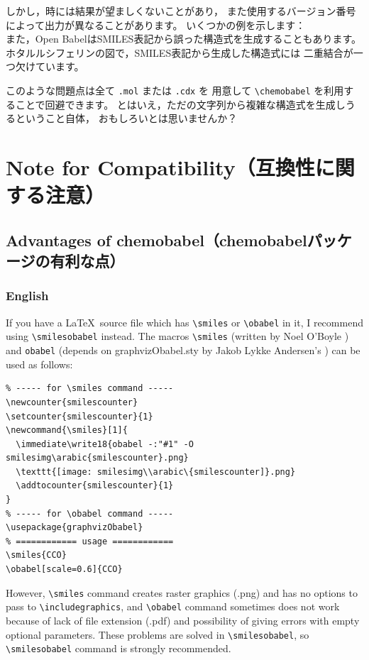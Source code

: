 \documentclass[12pt]{ltjsarticle}
\begin{document}
しかし，時には結果が望ましくないことがあり，
また使用するバージョン番号によって出力が異なることがあります。
いくつかの例を示します： \\

また，Open BabelはSMILES表記から誤った構造式を生成することもあります。
ホタルルシフェリンの図で，SMILES表記から生成した構造式には
二重結合が一つ欠けています。

このような問題点は全て \verb|.mol| または \verb|.cdx| を
用意して \verb|\chemobabel| を利用することで回避できます。
とはいえ，ただの文字列から複雑な構造式を生成しうるということ自体，
おもしろいとは思いませんか？

\clearpage

\section{Note for Compatibility（互換性に関する注意）}

\subsection{Advantages of \textsf{chemobabel}（\textsf{chemobabel}パッケージの有利な点）}

\subsubsection{English}

If you have a \LaTeX\ source file which has \verb|\smiles| or
\verb|\obabel| in it, I recommend using \verb|\smilesobabel| instead.
The macros \verb|\smiles| (written by Noel O'Boyle \cite{NOB1}) and
\verb|obabel| (depends on \textsf{graphvizObabel.sty} by
Jakob Lykke Andersen's \cite{JLA}) can be used as follows:
\begin{verbatim}
% ----- for \smiles command -----
\newcounter{smilescounter}
\setcounter{smilescounter}{1}
\newcommand{\smiles}[1]{
  \immediate\write18{obabel -:"#1" -O smilesimg\arabic{smilescounter}.png}
  \texttt{[image: smilesimg\\arabic\{smilescounter]}.png}
  \addtocounter{smilescounter}{1}
}
% ----- for \obabel command -----
\usepackage{graphvizObabel}
% ============ usage ============
\smiles{CCO}
\obabel[scale=0.6]{CCO}
\end{verbatim}
However, \verb|\smiles| command creates raster graphics (.png) and
has no options to pass to \verb|\includegraphics|, and \verb|\obabel| command
sometimes does not work because of lack of file extension (.pdf) and
possibility of giving errors with empty optional parameters.
These problems are solved in \verb|\smilesobabel|, so
\verb|\smilesobabel| command is strongly recommended.
\end{document}
